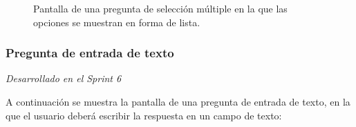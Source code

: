 \begin{figure}[H]
  \caption{Pantalla de una pregunta de selección múltiple en la que las opciones se muestran en forma de lista.}%
  \label{fig:example}%
\end{figure}



\newpage

\subsubsection{Pregunta de entrada de texto}

\label{sec:pregunic1}
\textit{Desarrollado en el Sprint 6}

A continuación se muestra la pantalla de una pregunta de entrada de texto, en la que el usuario deberá escribir la respuesta en un campo de texto:

\begin{figure}[H]%
  \centering
  \qquad

\end{figure}
